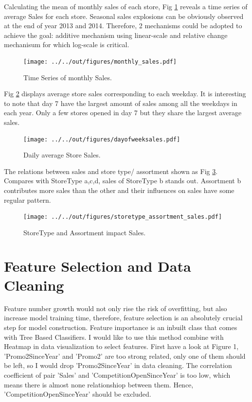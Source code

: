 \documentclass[11pt, a4paper, leqno]{article}
\begin{document}
Calculating the mean of monthly sales of each store, Fig \ref{fig:Monthly_Sales} reveals a time series of average Sales for each store. Seasonal sales explosions can be obviously observed at the end of year 2013 and 2014. Therefore, 2 mechanisms could be adopted to achieve the goal: additive mechanism using linear-scale and relative change mechanisum for which log-scale is critical\cite{euser2008practical,newman1993regression}.

\begin{figure}[ht]
\centering
\texttt{[image: ../../out/figures/monthly\_sales.pdf]}
\caption{Time Series of monthly Sales.}
\label{fig:Monthly_Sales}
\end{figure}

Fig \ref{fig:Daily_} displays average store sales corresponding to each weekday. It is interesting to note that day 7 have the largest amount of sales among all the weekdays in each year. Only a few stores opened in day 7 but they share the largest average sales.
\begin{figure}[ht]
\centering
\texttt{[image: ../../out/figures/dayofweeksales.pdf]}
\caption{Daily average Store Sales.}
\label{fig:Daily_}
\end{figure}

The relations between sales and store type/ assortment shown as Fig \ref{fig:StoreType_}. Compares with StoreType a,c,d, sales of StoreType b stands out. Assortment b contributes more sales than the other and their influences on sales have some regular pattern.
\begin{figure}[ht]
\centering
\texttt{[image: ../../out/figures/storetype\_assortment\_sales.pdf]}
\caption{StoreType and Assortment impact Sales.}
\label{fig:StoreType_}
\end{figure}

\section{Feature Selection and Data Cleaning}
Feature number growth would not only rise the risk of overfitting, but also increase model training time, therefore, feature selection is an absolutely crucial step for model construction\cite{kira1992practical,guyon2003introduction}. Feature importance is an inbuilt class that comes with Tree Based Classifiers.
I would like to use this method combine with Heatmap in data visualization to select features.
First have a look at Figure 1, 'Promo2SinceYear' and 'Promo2' are too strong related, only one of them should be left, so I would drop 'Promo2SinceYear' in data cleaning. The correlation coefficient of pair 'Sales' and 'CompetitionOpenSinceYear' is too low, which means there is almost none relationshiop between them. Hence, 'CompetitionOpenSinceYear' should be excluded.
\end{document}
